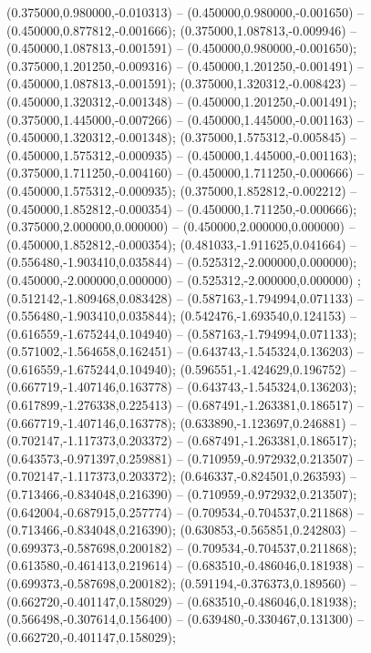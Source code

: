  (0.375000,0.980000,-0.010313) -- (0.450000,0.980000,-0.001650) -- (0.450000,0.877812,-0.001666);
 (0.375000,1.087813,-0.009946) -- (0.450000,1.087813,-0.001591) -- (0.450000,0.980000,-0.001650);
 (0.375000,1.201250,-0.009316) -- (0.450000,1.201250,-0.001491) -- (0.450000,1.087813,-0.001591);
 (0.375000,1.320312,-0.008423) -- (0.450000,1.320312,-0.001348) -- (0.450000,1.201250,-0.001491);
 (0.375000,1.445000,-0.007266) -- (0.450000,1.445000,-0.001163) -- (0.450000,1.320312,-0.001348);
 (0.375000,1.575312,-0.005845) -- (0.450000,1.575312,-0.000935) -- (0.450000,1.445000,-0.001163);
 (0.375000,1.711250,-0.004160) -- (0.450000,1.711250,-0.000666) -- (0.450000,1.575312,-0.000935);
 (0.375000,1.852812,-0.002212) -- (0.450000,1.852812,-0.000354) -- (0.450000,1.711250,-0.000666);
 (0.375000,2.000000,0.000000) -- (0.450000,2.000000,0.000000) -- (0.450000,1.852812,-0.000354);
 (0.481033,-1.911625,0.041664) -- (0.556480,-1.903410,0.035844) -- (0.525312,-2.000000,0.000000);
 (0.450000,-2.000000,0.000000) -- (0.525312,-2.000000,0.000000) ;
 (0.512142,-1.809468,0.083428) -- (0.587163,-1.794994,0.071133) -- (0.556480,-1.903410,0.035844);
 (0.542476,-1.693540,0.124153) -- (0.616559,-1.675244,0.104940) -- (0.587163,-1.794994,0.071133);
 (0.571002,-1.564658,0.162451) -- (0.643743,-1.545324,0.136203) -- (0.616559,-1.675244,0.104940);
 (0.596551,-1.424629,0.196752) -- (0.667719,-1.407146,0.163778) -- (0.643743,-1.545324,0.136203);
 (0.617899,-1.276338,0.225413) -- (0.687491,-1.263381,0.186517) -- (0.667719,-1.407146,0.163778);
 (0.633890,-1.123697,0.246881) -- (0.702147,-1.117373,0.203372) -- (0.687491,-1.263381,0.186517);
 (0.643573,-0.971397,0.259881) -- (0.710959,-0.972932,0.213507) -- (0.702147,-1.117373,0.203372);
 (0.646337,-0.824501,0.263593) -- (0.713466,-0.834048,0.216390) -- (0.710959,-0.972932,0.213507);
 (0.642004,-0.687915,0.257774) -- (0.709534,-0.704537,0.211868) -- (0.713466,-0.834048,0.216390);
 (0.630853,-0.565851,0.242803) -- (0.699373,-0.587698,0.200182) -- (0.709534,-0.704537,0.211868);
 (0.613580,-0.461413,0.219614) -- (0.683510,-0.486046,0.181938) -- (0.699373,-0.587698,0.200182);
 (0.591194,-0.376373,0.189560) -- (0.662720,-0.401147,0.158029) -- (0.683510,-0.486046,0.181938);
 (0.566498,-0.307614,0.156400) -- (0.639480,-0.330467,0.131300) -- (0.662720,-0.401147,0.158029);
